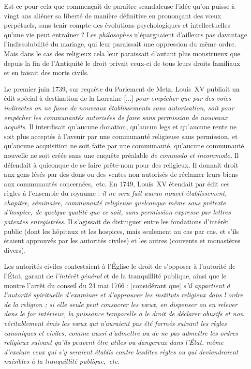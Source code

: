 Est-ce pour cela que commençait de paraître scandaleuse
l'idée qu'on puisse à vingt ans aliéner sa liberté de manière définitive en prononçant des vœux perpétuels, sans tenir compte des évolutions psychologiques et intellectuelles qu'une vie peut entraîner ? Les \emph{philosophes} n'épargnaient d'ailleurs pas davantage l'indissolubilité du mariage, qui leur paraissait une oppression du même ordre. Mais dans le cas des religieux cela leur paraissait d'autant plus monstrueux que depuis la fin de l'Antiquité le droit privait ceux-ci de tous leurs droits familiaux et en faisait des morts civils. 

 Le premier juin 1739, sur requête du Parlement de Metz, Louis~XV publiait un édit spécial à destination de la Lorraine {[...] \emph{pour empêcher que par des voies indirectes on ne fasse de nouveaux établissements sans autorisation, soit pour empêcher les communautés autorisées de faire sans permission de nouveaux acquêts}}. Il interdisait qu'aucune donation, qu'aucun legs et qu'aucune rente ne soit plus acceptés à l'avenir par une communauté religieuse sans permission, et qu'aucune acquisition ne soit faite par une communauté, qu'aucune communauté nouvelle ne soit créée sans une enquête préalable \emph{de commodo et incommodo}. Il défendait à quiconque de se faire prête-nom pour des religieux. Il donnait droit aux gens lésés par des dons ou des ventes non autorisés de réclamer leurs biens aux communautés concernées,~etc. En 1749, Louis~XV étendait par édit ces règles à l'ensemble du royaume : \emph{il ne sera fait aucun nouvel établissement, chapitre, séminaire, communauté religieuse quelconque même sous prétexte d'hospice, de quelque qualité que ce soit, sans permission expresse par lettres patentes enregistrées}. Il s'agissait de distinguer entre les fondations d'intérêt public (dont les hôpitaux et les hospices, mais seulement au cas par cas, et s'ils étaient approuvés par les autorités civiles) et les autres (couvents et monastères divers). 

 Les autorités civiles contestaient à l'Église le droit de s'opposer à l'autorité de l'État, garant de \emph{l'intérêt général} et de la tranquillité publique, ainsi que le montre l'arrêt du conseil du 24 mai 1766 : [considérant que] \emph{s'il appartient à l'autorité spirituelle d'examiner et d'approuver les instituts religieux dans l'ordre de la religion ; si elle seule peut consacrer les vœux, en dispenser ou en relever dans le for intérieur, la puissance temporelle a le droit de déclarer abusifs et non véritablement émis les vœux qui n'auraient pas été formés suivant les règles canoniques et civiles, comme aussi d'admettre ou de ne pas admettre les ordres religieux suivant qu'ils peuvent être utiles ou dangereux dans l'État, même d'exclure ceux qui s'y seraient établis contre lesdites règles ou qui deviendraient nuisibles à la tranquillité publique,~etc.}
 
